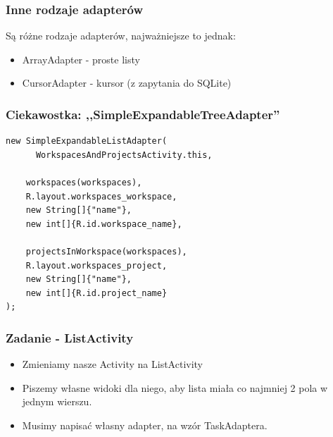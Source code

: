 \begin{frame}\frametitle{Inne rodzaje adapterów}
Są różne rodzaje adapterów, najważniejsze to jednak:
\begin{itemize}
 \item ArrayAdapter - proste listy
 \item CursorAdapter - kursor (z zapytania do SQLite)
\end{itemize}
\end{frame}

\begin{frame}[fragile]\frametitle{Ciekawostka: ,,\textbf{SimpleExpandableTreeAdapter}''}
\begin{lstlisting} 
new SimpleExpandableListAdapter(
      WorkspacesAndProjectsActivity.this,

    workspaces(workspaces),
    R.layout.workspaces_workspace,
    new String[]{"name"},
    new int[]{R.id.workspace_name},

    projectsInWorkspace(workspaces),
    R.layout.workspaces_project,
    new String[]{"name"},
    new int[]{R.id.project_name}
);
\end{lstlisting}

\end{frame}


\begin{frame}\frametitle{Zadanie - ListActivity}
\begin{itemize}
 \item Zmieniamy nasze Activity na ListActivity
 \pause \item Piszemy własne widoki dla niego, aby lista miała co najmniej 2 pola w jednym wierszu.
 \pause \item Musimy napisać własny adapter, na wzór TaskAdaptera.
\end{itemize}

\end{frame}




% 
